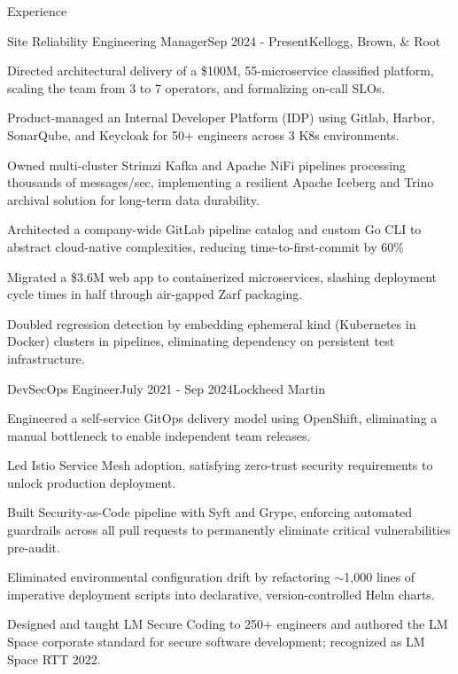 \documentclass[
	a4paper, %
	10pt, %
]{resume} %
\begin{document}
\begin{rSection}{Experience}

 	\begin{rSubsection}{Site Reliability Engineering Manager}{Sep 2024 - Present}{Kellogg, Brown, \& Root}
    \item Directed architectural delivery of a \$100M, 55-microservice classified platform, scaling the team from 3 to 7 operators, and formalizing on-call SLOs.
    \item Product-managed an Internal Developer Platform (IDP) using Gitlab, Harbor, SonarQube, and Keycloak for 50+ engineers across 3 K8s environments.
    \item Owned multi-cluster Strimzi Kafka and Apache NiFi pipelines processing thousands of messages/sec, implementing a resilient Apache Iceberg and Trino 
      archival solution for long-term data durability.
    \item Architected a company-wide GitLab pipeline catalog and custom Go CLI to abstract cloud-native complexities, reducing time-to-first-commit by 60\%
 		\item Migrated a \$3.6M web app to containerized microservices, slashing deployment cycle times in half through air-gapped Zarf packaging.
    \item Doubled regression detection by embedding ephemeral kind (Kubernetes in Docker) clusters in pipelines, eliminating dependency on persistent test infrastructure.
 	\end{rSubsection}
 	\begin{rSubsection}{DevSecOps Engineer}{July 2021 - Sep 2024}{Lockheed Martin}
 		\item Engineered a self-service GitOps delivery model using OpenShift, eliminating a manual bottleneck to enable independent team releases.
 		\item Led Istio Service Mesh adoption, satisfying zero-trust security requirements to unlock production deployment.
 		\item Built Security-as-Code pipeline with Syft and Grype, enforcing automated guardrails across all pull requests to permanently eliminate critical vulnerabilities pre-audit.
 		\item Eliminated environmental configuration drift by refactoring $\sim$1,000 lines of imperative deployment scripts into declarative, version-controlled Helm charts.
 		\item Designed and taught LM Secure Coding to 250+ engineers and authored the LM Space corporate standard for secure software development; recognized as LM Space RTT 2022.

\end{rSubsection}
\end{rSection}
\end{document}
